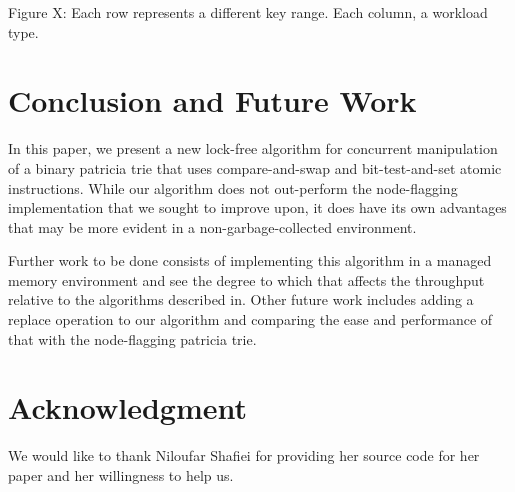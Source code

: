 \documentclass[conference]{IEEEtran}
\begin{document}
Figure X: Each row represents a different key range. Each column, a workload type.
\clearpage


\section{Conclusion and Future Work}
In this paper, we present a new lock-free algorithm for concurrent manipulation of a binary patricia trie that uses compare-and-swap and bit-test-and-set atomic instructions. While our algorithm does not out-perform the node-flagging implementation that we sought to improve upon, it does have its own advantages that may be more evident in a non-garbage-collected environment.
\par
Further work to be done consists of implementing this algorithm in a managed memory environment and see the degree to which that affects the throughput relative to the algorithms described in\cite{Shafiei2013}\cite{Natarajan2014}. Other future work includes adding a replace operation to our algorithm and comparing the ease and performance of that with the node-flagging patricia trie\cite{Shafiei2013}.


\section{Acknowledgment}
We would like to thank Niloufar Shafiei for providing her source code for her paper and her willingness to help us.




\end{document}
